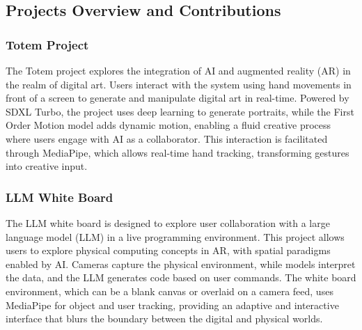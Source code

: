 \subsection{Projects Overview and Contributions}

\subsubsection{Totem Project}

The Totem project explores the integration of AI and augmented reality (AR) in the realm of digital art.
Users interact with the system using hand movements in front of a screen to generate and manipulate digital art in real-time.
Powered by SDXL Turbo, the project uses deep learning to generate portraits, while the First Order Motion model adds dynamic motion, enabling a fluid creative process where users engage with AI as a collaborator.
This interaction is facilitated through MediaPipe, which allows real-time hand tracking, transforming gestures into creative input.

\subsubsection{LLM White Board}

The LLM white board is designed to explore user collaboration with a large language model (LLM) in a live programming environment.
This project allows users to explore physical computing concepts in AR, with spatial paradigms enabled by AI.
Cameras capture the physical environment, while models interpret the data, and the LLM generates code based on user commands.
The white board environment, which can be a blank canvas or overlaid on a camera feed, uses MediaPipe for object and user tracking, providing an adaptive and interactive interface that blurs the boundary between the digital and physical worlds.
